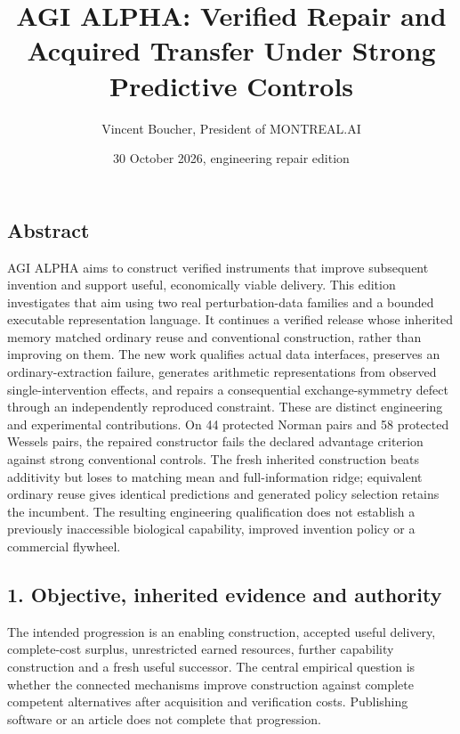 \documentclass[
  10pt,
]{article}
\title{AGI ALPHA: Verified Repair and Acquired Transfer Under Strong
Predictive Controls}
\author{Vincent Boucher, President of MONTREAL.AI}
\date{30 October 2026, engineering repair edition}
\begin{document}
\maketitle

\hypertarget{abstract}{%
\subsection{Abstract}\label{abstract}}

AGI ALPHA aims to construct verified instruments that improve subsequent
invention and support useful, economically viable delivery. This edition
investigates that aim using two real perturbation-data families and a
bounded executable representation language. It continues a verified
release whose inherited memory matched ordinary reuse and conventional
construction, rather than improving on them. The new work qualifies
actual data interfaces, preserves an ordinary-extraction failure,
generates arithmetic representations from observed single-intervention
effects, and repairs a consequential exchange-symmetry defect through an
independently reproduced constraint. These are distinct engineering and
experimental contributions. On 44 protected Norman pairs and 58
protected Wessels pairs, the repaired constructor fails the declared
advantage criterion against strong conventional controls. The fresh
inherited construction beats additivity but loses to matching mean and
full-information ridge; equivalent ordinary reuse gives identical
predictions and generated policy selection retains the incumbent. The
resulting engineering qualification does not establish a previously
inaccessible biological capability, improved invention policy or a
commercial flywheel.

\hypertarget{objective-inherited-evidence-and-authority}{%
\subsection{1. Objective, inherited evidence and
authority}\label{objective-inherited-evidence-and-authority}}

The intended progression is an enabling construction, accepted useful
delivery, complete-cost surplus, unrestricted earned resources, further
capability construction and a fresh useful successor. The central
empirical question is whether the connected mechanisms improve
construction against complete competent alternatives after acquisition
and verification costs. Publishing software or an article does not
complete that progression.
\end{document}
